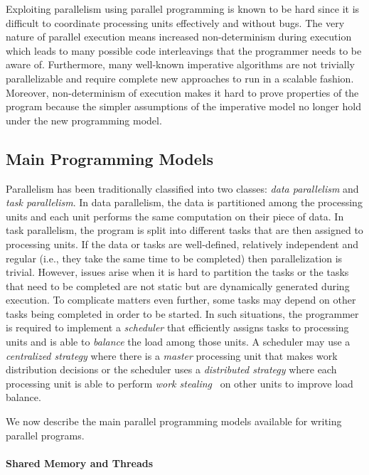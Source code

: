 Exploiting parallelism using parallel programming is known to be hard since it
is difficult to coordinate processing units effectively and without bugs. The
very nature of parallel execution means increased non-determinism during
execution which leads to many possible code interleavings that the programmer
needs to be aware of. Furthermore, many well-known imperative algorithms are not
trivially parallelizable and require complete new approaches to run in a
scalable fashion. Moreover, non-determinism of execution makes it hard to prove
properties of the program because the simpler assumptions of the imperative
model no longer hold under the new programming model.

\subsection{Main Programming Models}

Parallelism has been traditionally classified into two classes: \emph{data
parallelism} and \emph{task parallelism}. In data parallelism, the data is
partitioned among the processing units and each unit performs the same
computation on their piece of data. In task parallelism, the program is split
into different tasks that are then assigned to processing units. If the data or
tasks are well-defined, relatively independent and regular (i.e., they take the
same time to be completed) then parallelization is trivial. However, issues
arise when it is hard to partition the tasks or the tasks that need to be
completed are not static but are dynamically generated during execution. To
complicate matters even further, some tasks may depend on other tasks being
completed in order to be started. In such situations, the programmer is required
to implement a \emph{scheduler} that efficiently assigns tasks to processing
units and is able to \emph{balance} the load among those units. A scheduler may
use a \emph{centralized strategy} where there is a \emph{master} processing unit
that makes work distribution decisions or the scheduler uses a \emph{distributed
strategy} where each processing unit is able to perform \emph{work
stealing}~\cite{Blumofe:1999} on other units to improve load balance.

We now describe the main parallel programming models available for writing
parallel programs.

\paragraph{Shared Memory and Threads}

